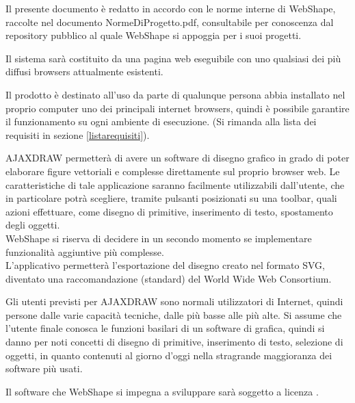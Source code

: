 
Il presente documento \`e redatto in accordo con le norme interne di WebShape, raccolte nel documento NormeDiProgetto.pdf, consultabile per conoscenza dal repository pubblico al quale WebShape si appoggia per i suoi progetti.



Il sistema sar\`a costituito da una pagina web eseguibile con uno qualsiasi dei pi\`u diffusi browsers attualmente esistenti.

Il prodotto \`e destinato all'uso da parte di qualunque persona abbia installato nel proprio computer uno dei principali internet browsers, quindi \`e possibile garantire il funzionamento su ogni ambiente di esecuzione. (Si rimanda alla lista dei requisiti in sezione \ref{listarequisiti}).

AJAXDRAW permetter\`a di avere un software di disegno grafico in grado di poter elaborare figure vettoriali e complesse direttamente sul proprio browser web. Le caratteristiche di tale applicazione saranno facilmente utilizzabili dall'utente, che in particolare potr\`a scegliere, tramite pulsanti posizionati su una toolbar, quali azioni effettuare, come disegno di primitive, inserimento di testo, spostamento degli oggetti.\\
WebShape si riserva di decidere in un secondo momento se implementare funzionalit\`a aggiuntive pi\`u complesse.\\
L'applicativo permetter\`a l'esportazione del disegno creato nel formato SVG, diventato una raccomandazione (standard) del World Wide Web Consortium.

\label{definizione_utente}
Gli utenti previsti per AJAXDRAW sono normali utilizzatori di Internet, quindi persone dalle varie capacit\`a tecniche, dalle pi\`u basse alle pi\`u alte. Si assume che l'utente finale conosca le funzioni basilari di un software di grafica, quindi si danno per noti concetti di disegno di primitive, inserimento di testo, selezione di oggetti, in quanto contenuti al giorno d'oggi nella stragrande maggioranza dei software pi\`u usati.

Il software che WebShape si impegna a sviluppare sar\`a soggetto a licenza .

